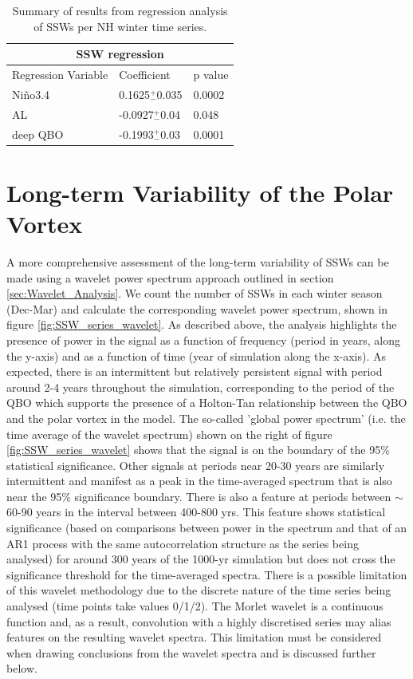 \begin{table}[h!]
\centering
\begin{tabular}{|p{3cm}||p{3cm}|p{3cm}|}
 \hline
 \multicolumn{3}{|c|}{SSW regression}\\
 \hline
 Regression Variable& Coefficient& p value\\
 \hline
 Ni\~{n}o3.4  & 0.1625$^+_-$0.035& 0.0002\\
 AL  &   -0.0927$^+_-$0.04  & 0.048\\
 deep QBO  & -0.1993$^+_-$0.03&0.0001\\
 \hline
 \end{tabular}
\begin{center}
\caption{Summary of results from regression analysis of SSWs per NH winter time series.}
\label{table:regression_SSW}
\end{center}
\end{table}


\section{Long-term Variability of the Polar Vortex}
A more comprehensive assessment of the long-term variability of SSWs can be made using a wavelet power spectrum approach outlined in section \ref{sec:Wavelet_Analysis}. We count the number of SSWs in each winter season (Dec-Mar) and calculate the corresponding wavelet power spectrum, shown in figure \ref{fig:SSW_series_wavelet}. As described above, the analysis highlights the presence of power in the signal as a function of frequency (period in years, along the y-axis) and as a function of time (year of simulation along the x-axis). As expected, there is an intermittent but relatively persistent signal with period around 2-4 years throughout the simulation, corresponding to the period of the QBO which supports the presence of a Holton-Tan relationship between the QBO and the polar vortex in the model. The so-called 'global power spectrum' (i.e. the time average of the wavelet spectrum) shown on the right of figure \ref{fig:SSW_series_wavelet} shows that the signal is on the boundary of the 95\% statistical significance. Other signals at periods near 20-30 years are similarly intermittent and manifest as a peak in the time-averaged spectrum that is also near the 95\% significance boundary. There is also a feature at periods between $\sim$60-90 years in the interval between 400-800 yrs. This feature shows statistical significance (based on comparisons between power in the spectrum and that of an AR1 process with the same autocorrelation structure as the series being analysed) for around 300 years of the 1000-yr simulation but does not cross the significance threshold for the time-averaged spectra. There is a possible limitation of this wavelet methodology due to the discrete nature of the time series being analysed (time points take values 0/1/2). The Morlet wavelet is a continuous function and, as a result, convolution with a highly discretised series may alias features on the resulting wavelet spectra. This limitation must be considered when drawing conclusions from the wavelet spectra and is discussed further below.


